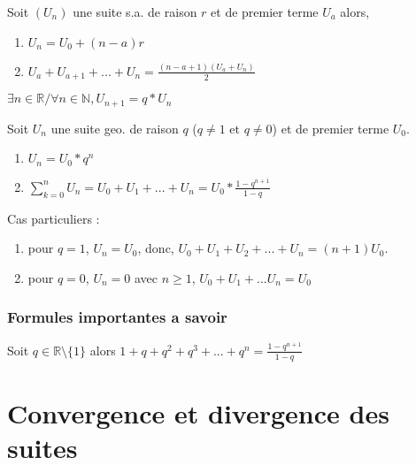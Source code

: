 \documentclass[a4paper,10pt]{book}
\begin{document}
	\begin{prop}
		Soit $(U_n)$ une suite s.a. de raison $r$ et de premier terme $U_a$ alors,
		\begin{enumerate}
			\item $U_n = U_0 + (n-a)r$
			\item $U_a + U_{a+1} + ... + U_n = \frac{(n-a+1)(U_a+U_n)}{2}$
		\end{enumerate}
	\end{prop}

	$\exists n \in \mathbb{R} / \forall n \in \mathbb{N}, U_{n+1} = q * U_n$

	\begin{prop}
		Soit $U_n$ une suite geo. de raison $q$ ($q \neq 1 \text{ et } q \neq 0$) et de premier terme $U_0$.
		\begin{enumerate}
			\item $U_n = U_0 * q^n$
			\item $\sum_{k = 0}^{n}U_n = U_0 + U_1 + ... + U_n = U_0 * \frac{1-q^{n+1}}{1 - q}$\\
		\end{enumerate}

		Cas particuliers :
		\begin{enumerate}
			\item pour $q=1$, $U_n = U_0$, donc, $U_0 + U_1 + U_2 + ... + U_n = (n+1)U_0$.
			\item pour $q=0$, $U_n = 0$ avec $n \geq 1$, $U_0 + U_1 + ... U_n = U_0$\\
		\end{enumerate}
	\end{prop}

	\subsection{Formules importantes a savoir}
	\label{sub:Formules importantes a savoir}

	\begin{prop}
		Soit $q \in \mathbb{R} \setminus \big\{1\big\} $ alors $1+q+q^2+q^3+...+q^n = \frac{1-q^{n+1}}{1-q}$
	\end{prop}


	\chapter{Convergence et divergence des suites}
	\label{chap:Convergence et divergence des suites}
\end{document}

